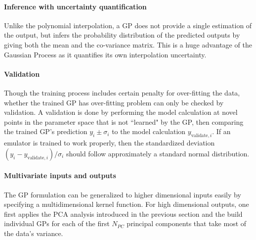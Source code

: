 \paragraph{Inference with uncertainty quantification} Unlike the polynomial interpolation, a GP does not provide a single estimation of the output, but infers the probability distribution of the predicted outputs by giving both the mean and the co-variance matrix.
This is a huge advantage of the Gaussian Process as it quantifies its own interpolation uncertainty.

\paragraph{Validation} Though the training process includes certain penalty for over-fitting the data, whether the trained GP has over-fitting problem can only be checked by validation.
A validation is done by performing the model calculation at novel points in the parameter space that is not ``learned" by the GP, then comparing the trained GP's prediction $y_i \pm \sigma_i$ to the model calculation $y_{\textrm{validate}, i}$.
If an emulator is trained to work properly, then the standardized deviation $(y_i - y_{\textrm{validate}, i})/\sigma_i$ should follow approximately a standard normal distribution.

\paragraph{Multivariate inputs and outputs} The GP formulation can be generalized to higher dimensional inputs easily by specifying a multidimensional kernel function.
For high dimensional outputs, one first applies the PCA analysis introduced in the previous section and the build individual GPs for each of the first $N_{PC}$ principal components that take most of the data's variance.

